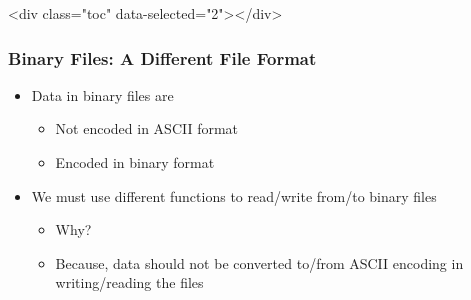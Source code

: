 \documentclass{../c-lecture}
\begin{document}
\begin{frame}
  <div class="toc" data-selected="2"></div>
\end{frame}
\begin{frame}
  \frametitle{Binary Files: A Different File Format}
  \begin{itemize}
    \item Data in binary files are
    \begin{itemize}
      \item Not encoded in ASCII format
      \item Encoded in binary format
    \end{itemize}
    \item We must use different functions to read/write from/to binary files
    \begin{itemize}
      \item Why?
      \item
        Because, data should not be converted to/from ASCII encoding in
        writing/reading the files

    \end{itemize}
  \end{itemize}
\end{frame}
\end{document}
